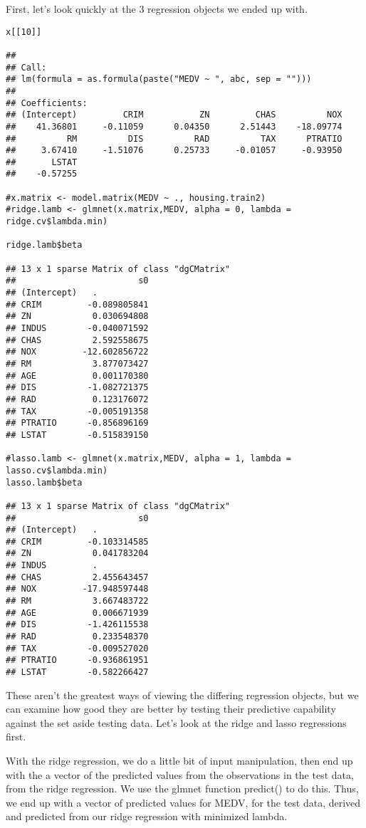 \documentclass[]{article}
\begin{document}
First, let's look quickly at the 3 regression objects we ended up with.

\begin{verbatim}
x[[10]]

## 
## Call:
## lm(formula = as.formula(paste("MEDV ~ ", abc, sep = "")))
## 
## Coefficients:
## (Intercept)         CRIM           ZN         CHAS          NOX  
##    41.36801     -0.11059      0.04350      2.51443    -18.09774  
##          RM          DIS          RAD          TAX      PTRATIO  
##     3.67410     -1.51076      0.25733     -0.01057     -0.93950  
##       LSTAT  
##    -0.57255

#x.matrix <- model.matrix(MEDV ~ ., housing.train2)
#ridge.lamb <- glmnet(x.matrix,MEDV, alpha = 0, lambda = ridge.cv$lambda.min)

ridge.lamb$beta

## 13 x 1 sparse Matrix of class "dgCMatrix"
##                        s0
## (Intercept)   .          
## CRIM         -0.089805841
## ZN            0.030694808
## INDUS        -0.040071592
## CHAS          2.592558675
## NOX         -12.602856722
## RM            3.877073427
## AGE           0.001170380
## DIS          -1.082721375
## RAD           0.123176072
## TAX          -0.005191358
## PTRATIO      -0.856896169
## LSTAT        -0.515839150

#lasso.lamb <- glmnet(x.matrix,MEDV, alpha = 1, lambda = lasso.cv$lambda.min)
lasso.lamb$beta

## 13 x 1 sparse Matrix of class "dgCMatrix"
##                        s0
## (Intercept)   .          
## CRIM         -0.103314585
## ZN            0.041783204
## INDUS         .          
## CHAS          2.455643457
## NOX         -17.948597448
## RM            3.667483722
## AGE           0.006671939
## DIS          -1.426115538
## RAD           0.233548370
## TAX          -0.009527020
## PTRATIO      -0.936861951
## LSTAT        -0.582266427
\end{verbatim}

These aren't the greatest ways of viewing the differing regression
objects, but we can examine how good they are better by testing their
predictive capability against the set aside testing data. Let's look at
the ridge and lasso regressions first.

With the ridge regression, we do a little bit of input manipulation,
then end up with the a vector of the predicted values from the
observations in the test data, from the ridge regression. We use the
glmnet function predict() to do this. Thus, we end up with a vector of
predicted values for MEDV, for the test data, derived and predicted from
our ridge regression with minimized lambda.
\end{document}
